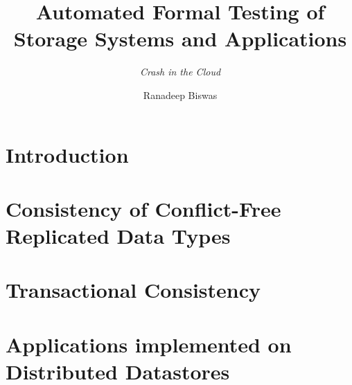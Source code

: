 \documentclass{mimosis}
\title{Automated Formal Testing of Storage Systems and Applications}
\subtitle{\emph{Crash in the Cloud}}
\author{Ranadeep Biswas}
\begin{document}
\frontmatter  
  
  

  

  \tableofcontents

\mainmatter

  \chapter{Introduction}

  

  \chapter{Consistency of Conflict-Free Replicated Data Types}
  \label{chap:crdt}

  
  
  
  
  
  
  
  
  

  \chapter{Transactional Consistency}
  \label{chap:txn}

  
  
  
  
  
  

  \chapter{Applications implemented on Distributed Datastores}
  \label{chap:dist-app}

  
  
  
  
  
  
  
  
  

\backmatter


  \printindex
  \printbibliography
\end{document}

